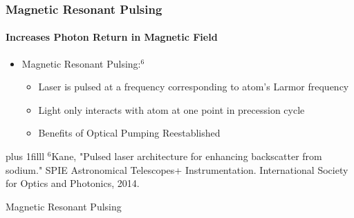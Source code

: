 \documentclass{beamer}
\newcommand{\btVFill}{\vskip0pt plus 1filll}
\begin{document}
\begin{frame}
  \frametitle{Magnetic Resonant Pulsing}
  \framesubtitle{Increases Photon Return in Magnetic Field}
  \begin{itemize}
	\item Magnetic Resonant Pulsing:$^6$
	  \begin{itemize}
		\item Laser is pulsed at a frequency corresponding to atom's Larmor frequency
		\item Light only interacts with atom at one point in precession cycle
		\item Benefits of Optical Pumping Reestablished 
	  \end{itemize}
  \end{itemize}
  \bigskip
  \btVFill
{\tiny $^6$Kane, "Pulsed laser architecture for enhancing backscatter from sodium." SPIE Astronomical Telescopes+ Instrumentation. International Society for Optics and Photonics, 2014.}
\end{frame}



\begin{frame}{Magnetic Resonant Pulsing}
  \framesubtitle{}
\end{frame}
\end{document}
